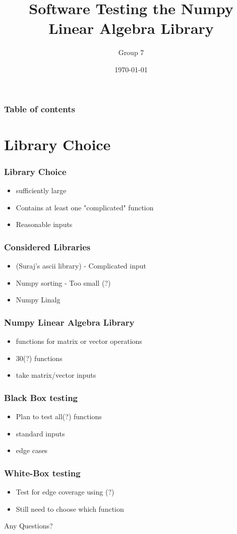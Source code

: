 \documentclass{beamer}
\begin{document}
\title{Software Testing the Numpy Linear Algebra Library}  
\author{Group 7}

\date{\today} 
\begin{frame}
\titlepage
\end{frame}

\begin{frame}\frametitle{Table of contents}\tableofcontents
\end{frame} 

\section{Library Choice}
\begin{frame}
\frametitle{Library Choice} 
\begin{itemize}
\item sufficiently large\\
\item Contains at least one "complicated" function\\
\item Reasonable inputs \\
\end{itemize}
\end{frame}

\begin{frame}\frametitle{Considered Libraries} 
\begin{itemize}
\item (Suraj's ascii library) - Complicated input 
\item Numpy sorting - Too small (?)
\item Numpy Linalg 
\end{itemize}
\end{frame}


\begin{frame}\frametitle{Numpy Linear Algebra Library} 
\begin{itemize}

\item functions for matrix or vector operations 
\item 30(?) functions
\item take matrix/vector inputs 
\end{itemize}
\end{frame}


\begin{frame}\frametitle{Black Box testing} 

\begin{itemize}
\item Plan to test all(?) functions
\item standard inputs
\item edge cases

\end{itemize}
\end{frame}


\begin{frame}\frametitle{White-Box testing} 
\begin{itemize}
\item Test for edge coverage using (?)
\item Still need to choose which function
\end{itemize}
\end{frame}

\begin{frame}
Any Questions?
\end{frame}
\end{document}
